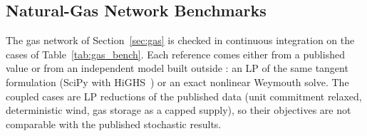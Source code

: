 \subsection{Natural-Gas Network Benchmarks}
\label{sec:gas_bench}

The gas network of Section~\ref{sec:gas} is checked in continuous
integration on the cases of Table~\ref{tab:gas_bench}.  Each reference
comes either from a published value or from an independent model built
outside \gtopt{}: an LP of the same tangent formulation (SciPy with
HiGHS~\cite{huangfu2018highs}) or an exact nonlinear Weymouth solve.
The coupled cases are LP reductions of the published data (unit
commitment relaxed, deterministic wind, gas storage as a capped
supply), so their objectives are not comparable with the published
stochastic results.

